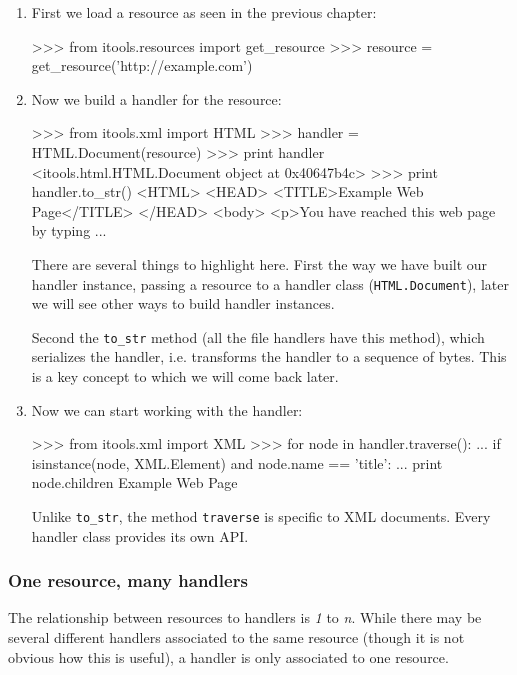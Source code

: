 \begin{enumerate}
  \item First we load a resource as seen in the previous chapter:
\begin{code}
    >>> from itools.resources import get_resource
    >>> resource = get_resource('http://example.com')
\end{code}

  \item Now we build a handler for the resource:
\begin{code}
    >>> from itools.xml import HTML
    >>> handler = HTML.Document(resource)
    >>> print handler
    <itools.html.HTML.Document object at 0x40647b4c>
    >>> print handler.to_str()
    <HTML>
    <HEAD>
      <TITLE>Example Web Page</TITLE>
    </HEAD> 
    <body>  
    <p>You have reached this web page by typing
    ...
\end{code}

    There are several things to highlight here. First the way we have built
    our handler instance, passing a resource to a handler class
    ({\tt HTML.Document}), later we will see other ways to build handler
    instances.

    Second the {\tt to\_str} method (all the file handlers have this
    method), which serializes the handler, i.e. transforms the handler to
    a sequence of bytes. This is a key concept to which we will come back
    later.

  \item Now we can start working with the handler:
\begin{code}
    >>> from itools.xml import XML
    >>> for node in handler.traverse():
    ...     if isinstance(node, XML.Element) and node.name == 'title':
    ...         print node.children
    Example Web Page
\end{code}

   Unlike {\tt to\_str}, the method {\tt traverse} is specific to XML
   documents. Every handler class provides its own API.
\end{enumerate}


\subsubsection{One resource, many handlers}

The relationship between resources to handlers is {\em 1} to {\em n}.
While there may be several different handlers associated to the same
resource (though it is not obvious how this is useful), a handler is
only associated to one resource.

